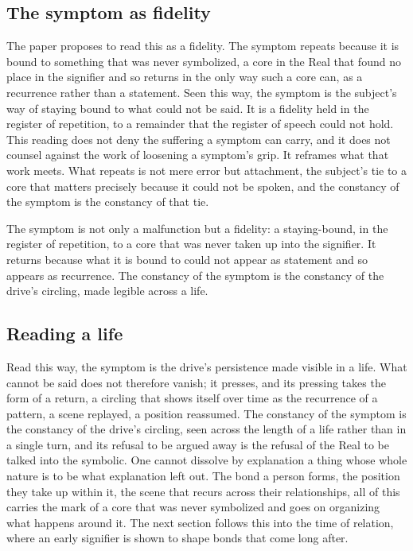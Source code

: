 \subsection*{The symptom as fidelity}

The paper proposes to read this as a fidelity. The symptom repeats because it is bound to something that was never symbolized, a core in the Real that found no place in the signifier and so returns in the only way such a core can, as a recurrence rather than a statement. Seen this way, the symptom is the subject's way of staying bound to what could not be said. It is a fidelity held in the register of repetition, to a remainder that the register of speech could not hold. This reading does not deny the suffering a symptom can carry, and it does not counsel against the work of loosening a symptom's grip. It reframes what that work meets. What repeats is not mere error but attachment, the subject's tie to a core that matters precisely because it could not be spoken, and the constancy of the symptom is the constancy of that tie.

\begin{claim}
The symptom is not only a malfunction but a fidelity: a staying-bound, in the register of repetition, to a core that was never taken up into the signifier. It returns because what it is bound to could not appear as statement and so appears as recurrence. The constancy of the symptom is the constancy of the drive's circling, made legible across a life.
\end{claim}

\subsection*{Reading a life}

Read this way, the symptom is the drive's persistence made visible in a life. What cannot be said does not therefore vanish; it presses, and its pressing takes the form of a return, a circling that shows itself over time as the recurrence of a pattern, a scene replayed, a position reassumed. The constancy of the symptom is the constancy of the drive's circling, seen across the length of a life rather than in a single turn, and its refusal to be argued away is the refusal of the Real to be talked into the symbolic. One cannot dissolve by explanation a thing whose whole nature is to be what explanation left out. The bond a person forms, the position they take up within it, the scene that recurs across their relationships, all of this carries the mark of a core that was never symbolized and goes on organizing what happens around it. The next section follows this into the time of relation, where an early signifier is shown to shape bonds that come long after.
